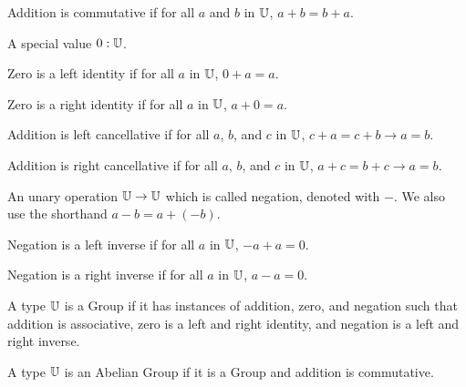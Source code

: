 \documentclass[../math.tex]{subfiles}
\begin{document}
\begin{class}
    Addition is commutative if for all $a$ and $b$ in $\mathbb{U}$, $a + b = b + a$.
\end{class}

\begin{class}
    A special value $0 : \mathbb{U}$.
\end{class}

\begin{class}
    Zero is a left identity if for all $a$ in $\mathbb{U}$, $0 + a = a$.
\end{class}

\begin{class}
    Zero is a right identity if for all $a$ in $\mathbb{U}$, $a + 0 = a$.
\end{class}

\begin{class}
    Addition is left cancellative if for all $a$, $b$, and $c$ in $\mathbb{U}$, $c + a =
    c + b \rightarrow a = b$.
\end{class}

\begin{class}
    Addition is right cancellative if for all $a$, $b$, and $c$ in $\mathbb{U}$, $a + c
    = b + c \rightarrow a = b$.
\end{class}

\begin{class}
    An unary operation $\mathbb{U} \rightarrow \mathbb{U}$ which is called negation, denoted
    with $-$.  We also use the shorthand $a - b = a + (-b)$.
\end{class}

\begin{class}
    Negation is a left inverse if for all $a$ in $\mathbb{U}$, $-a + a = 0$.
\end{class}

\begin{class}
    Negation is a right inverse if for all $a$ in $\mathbb{U}$, $a - a = 0$.
\end{class}

\begin{class}[Group]
    A type $\mathbb{U}$ is a Group if it has instances of addition, zero, and negation
    such that addition is associative, zero is a left and right identity, and
    negation is a left and right inverse.
\end{class}

\begin{class}
    A type $\mathbb{U}$ is an Abelian Group if it is a Group and addition is
    commutative.
\end{class}
\end{document}
